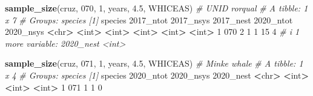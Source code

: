 \documentclass[
]{book}
\newenvironment{Shaded}{\begin{snugshade}}{\end{snugshade}}
\newcommand{\AttributeTok}[1]{\textcolor[rgb]{0.13,0.29,0.53}{#1}}
\newcommand{\CommentTok}[1]{\textcolor[rgb]{0.56,0.35,0.01}{\textit{#1}}}
\newcommand{\DecValTok}[1]{\textcolor[rgb]{0.00,0.00,0.81}{#1}}
\newcommand{\ErrorTok}[1]{\textcolor[rgb]{0.64,0.00,0.00}{\textbf{#1}}}
\newcommand{\FloatTok}[1]{\textcolor[rgb]{0.00,0.00,0.81}{#1}}
\newcommand{\FunctionTok}[1]{\textcolor[rgb]{0.13,0.29,0.53}{\textbf{#1}}}
\newcommand{\NormalTok}[1]{#1}
\newcommand{\SpecialCharTok}[1]{\textcolor[rgb]{0.81,0.36,0.00}{\textbf{#1}}}
\newcommand{\StringTok}[1]{\textcolor[rgb]{0.31,0.60,0.02}{#1}}
\begin{document}
\begin{Shaded}
\begin{Highlighting}[]
\FunctionTok{sample\_size}\NormalTok{(cruz, }\StringTok{\textquotesingle{}070\textquotesingle{}}\NormalTok{, }\DecValTok{1}\NormalTok{, years, }\FloatTok{4.5}\NormalTok{, }\StringTok{\textquotesingle{}WHICEAS\textquotesingle{}}\NormalTok{) }\CommentTok{\# UNID rorqual}
\CommentTok{\# A tibble: 1 x 7}
\CommentTok{\# Groups:   species [1]}
\NormalTok{  species }\StringTok{\textasciigrave{}}\AttributeTok{2017\_ntot}\StringTok{\textasciigrave{}} \StringTok{\textasciigrave{}}\AttributeTok{2017\_nsys}\StringTok{\textasciigrave{}} \StringTok{\textasciigrave{}}\AttributeTok{2017\_nest}\StringTok{\textasciigrave{}} \StringTok{\textasciigrave{}}\AttributeTok{2020\_ntot}\StringTok{\textasciigrave{}} \StringTok{\textasciigrave{}}\AttributeTok{2020\_nsys}\StringTok{\textasciigrave{}}
  \SpecialCharTok{\textless{}}\NormalTok{chr}\SpecialCharTok{\textgreater{}}         \ErrorTok{\textless{}}\NormalTok{int}\SpecialCharTok{\textgreater{}}       \ErrorTok{\textless{}}\NormalTok{int}\SpecialCharTok{\textgreater{}}       \ErrorTok{\textless{}}\NormalTok{int}\SpecialCharTok{\textgreater{}}       \ErrorTok{\textless{}}\NormalTok{int}\SpecialCharTok{\textgreater{}}       \ErrorTok{\textless{}}\NormalTok{int}\SpecialCharTok{\textgreater{}}
\DecValTok{1} \DecValTok{070}               \DecValTok{2}           \DecValTok{1}           \DecValTok{1}          \DecValTok{15}           \DecValTok{4}
\CommentTok{\# i 1 more variable: \textasciigrave{}2020\_nest\textasciigrave{} \textless{}int\textgreater{}}

\FunctionTok{sample\_size}\NormalTok{(cruz, }\StringTok{\textquotesingle{}071\textquotesingle{}}\NormalTok{, }\DecValTok{1}\NormalTok{, years, }\FloatTok{4.5}\NormalTok{, }\StringTok{\textquotesingle{}WHICEAS\textquotesingle{}}\NormalTok{) }\CommentTok{\# Minke whale}
\CommentTok{\# A tibble: 1 x 4}
\CommentTok{\# Groups:   species [1]}
\NormalTok{  species }\StringTok{\textasciigrave{}}\AttributeTok{2020\_ntot}\StringTok{\textasciigrave{}} \StringTok{\textasciigrave{}}\AttributeTok{2020\_nsys}\StringTok{\textasciigrave{}} \StringTok{\textasciigrave{}}\AttributeTok{2020\_nest}\StringTok{\textasciigrave{}}
  \SpecialCharTok{\textless{}}\NormalTok{chr}\SpecialCharTok{\textgreater{}}         \ErrorTok{\textless{}}\NormalTok{int}\SpecialCharTok{\textgreater{}}       \ErrorTok{\textless{}}\NormalTok{int}\SpecialCharTok{\textgreater{}}       \ErrorTok{\textless{}}\NormalTok{int}\SpecialCharTok{\textgreater{}}
\DecValTok{1} \DecValTok{071}               \DecValTok{1}           \DecValTok{1}           \DecValTok{0}


\end{Highlighting}
\end{Shaded}
\end{document}
